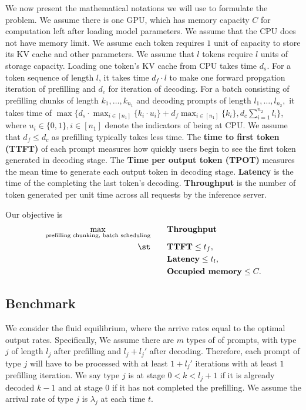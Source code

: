 \documentclass[opre, nonblindrev]{informs3} %
\begin{document}
We now present the mathematical notations we will use to formulate the problem. We assume there is one GPU, which has memory capacity $C$ for computation left after loading model parameters. We assume that the CPU does not have memory limit. We assume each token requires $1$ unit of capacity to store its KV cache and other parameters. We assume that $l$ tokens require $l$ units of storage capacity. Loading one token's KV cache from CPU takes time $d_s.$  For a token sequence of length $l$, it takes time $d_f\cdot l$ to make one forward propgation iteration of prefilling and $d_c$ for iteration of decoding. For a batch consisting of prefilling chunks of length $k_1,\dots,k_{n_1}$ and decoding prompts of length $l_1,\dots,l_{n_2},$ it takes time of $\max\{d_s\cdot \max_{i\in[n_1]}\{k_i\cdot u_i\}+ d_f\max_{i\in[n_1]}\{k_i\}, d_c\sum_{i=1}^{n_2}l_i\}$, where $u_i\in\{0,1\},i\in[n_1]$ denote the indicators of being at CPU. We assume that $d_f \le d_c$ as prefilling typically takes less time. The \textbf{time to first token (TTFT)} of each prompt measures how quickly users begin to see the first token generated in decoding stage. The \textbf{Time per output token (TPOT)} measures the mean time to generate each output token in decoding stage. \textbf{Latency} is the time of the completing the last token's decoding. \textbf{Throughput} is the number of token generated per unit time across all requests by the inference server. 

Our objective is 
\begin{equation}
    \label{prob:maximize}
    \begin{aligned}
        \max_{\text{prefilling chunking, batch scheduling}} \qquad & \textbf{Throughput}\\ 
        \st \qquad & \textbf{TTFT} \le t_f,\\
        & \textbf{Latency} \le t_l,\\ 
        & \textbf{Occupied memory} \le C.
    \end{aligned}
\end{equation}

\subsection{Benchmark}
We consider the fluid equilibrium, where the arrive rates equal to the optimal output rates. Specifically, We assume there are $m$ types of of prompts, with type $j$ of length $l_j$ after prefilling and $l_j+l_j'$ after decoding. Therefore, each prompt of type $j$ will have to be processed with at least $1+l_j'$ iterations with at least $1$ prefilling iteration. We say type $j$ is at stage $0<k<l_j+1$ if it is algready decoded $k-1$ and at stage $0$ if it has not completed the prefilling.  We assume the arrival rate of type $j$ is $\lambda_j$ at each time $t$. 
\end{document}
